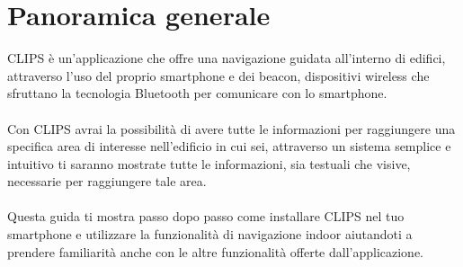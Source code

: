 \documentclass[../ClipsManualeUtente.tex]{subfiles}
\begin{document}
\section{Panoramica generale}

	CLIPS è un'applicazione che offre una navigazione guidata all'interno di edifici, attraverso l'uso del proprio smartphone e dei beacon, dispositivi wireless che sfruttano la tecnologia Bluetooth per comunicare con lo smartphone. 
	\paragraph*{}
	Con CLIPS avrai la possibilità di avere tutte le informazioni per raggiungere una specifica area di interesse nell'edificio in cui sei, attraverso un sistema semplice e intuitivo ti saranno mostrate tutte le informazioni, sia testuali che visive, necessarie per raggiungere tale area.
	\paragraph*{}
	Questa guida ti mostra passo dopo passo come installare CLIPS nel tuo smartphone e utilizzare la funzionalità di navigazione indoor aiutandoti a prendere familiarità anche con le altre funzionalità offerte dall'applicazione.
	
	
\end{document}
